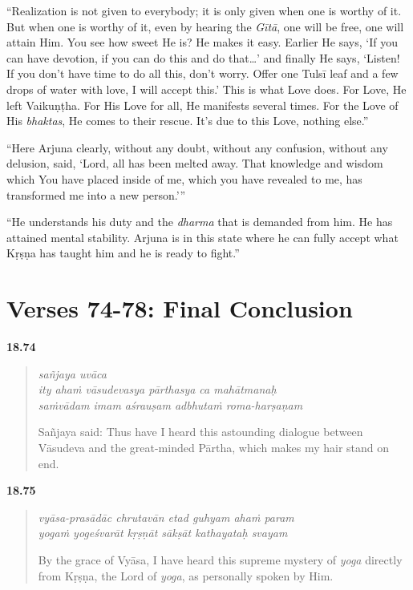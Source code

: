 \enquote{Realization is not given to everybody; it is only given when one is worthy of it. But when one is worthy of it, even by hearing the \textit{Gītā}, one will be free, one will attain Him. You see how sweet He is? He makes it easy. Earlier He says, \enquote{If you can have devotion, if you can do this and do that\ldots} and finally He says, \enquote{Listen! If you don’t have time to do all this, don’t worry. Offer one Tulsī leaf and a few drops of water with love, I will accept this.} This is what Love does. For Love, He left Vaikuṇṭha. For His Love for all, He manifests several times. For the Love of His \textit{bhaktas}, He comes to their rescue. It’s due to this Love, nothing else.}

\enquote{Here Arjuna clearly, without any doubt, without any confusion, without any delusion, said, \enquote{Lord, all has been melted away. That knowledge and wisdom which You have placed inside of me, which you have revealed to me, has transformed me into a new person.}}

\enquote{He understands his duty and the \textit{dharma} that is demanded from him. He has attained mental stability. Arjuna is in this state where he can fully accept what Kṛṣṇa has taught him and he is ready to fight.}

\section{Verses 74-78: Final Conclusion}\label{sec-verses-74-78-final-conclusion}


\par\noindent\textbf{18.74}\par
\begin{verse}
\textit{sañjaya uvāca} \\
\textit{ity ahaṁ vāsudevasya pārthasya ca mahātmanaḥ} \\
\textit{saṁvādam imam aśrauṣam adbhutaṁ roma-harṣaṇam}

\noindent Sañjaya said: Thus have I heard this astounding dialogue between Vāsudeva and the great-minded Pārtha, which makes my hair stand on end.
\end{verse}
\par



\par\noindent\textbf{18.75}\par
\begin{verse}
\textit{vyāsa-prasādāc chrutavān etad guhyam ahaṁ param} \\
\textit{yogaṁ yogeśvarāt kṛṣṇāt sākṣāt kathayataḥ svayam}

\noindent By the grace of Vyāsa, I have heard this supreme mystery of \textit{yoga} directly from Kṛṣṇa, the Lord of \textit{yoga}, as personally spoken by Him.
\end{verse}
\par



